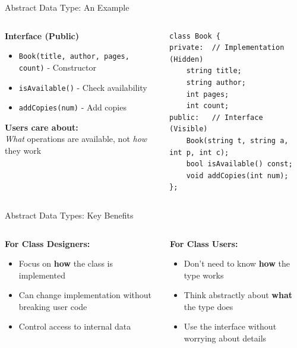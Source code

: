 \begin{frame}[fragile]{Abstract Data Type: An Example}
    \begin{columns}
        \begin{column}{0.5\textwidth}
        \textbf{Interface (Public)}
            \begin{itemize}
                \item \texttt{Book(title, author, pages, count)} - Constructor
                \item \texttt{isAvailable()} - Check availability
                \item \texttt{addCopies(num)} - Add copies
            \end{itemize}
            \vspace{0.3em}
            \textbf{Users care about:} \\
            \textit{What} operations are available, not \textit{how} they work
        \end{column}
        \begin{column}{0.5\textwidth}
            \begin{verbatim}
class Book {
private:  // Implementation (Hidden)
    string title;
    string author;
    int pages;
    int count;
public:   // Interface (Visible)
    Book(string t, string a, int p, int c);
    bool isAvailable() const;
    void addCopies(int num);
};
            \end{verbatim}
        \end{column}
    \end{columns}
\end{frame}

\begin{frame}[fragile]{Abstract Data Types: Key Benefits}

    \begin{columns}
        \begin{column}{0.5\textwidth}
            \textbf{For Class Designers:}
            \begin{itemize}
                \item Focus on \textbf{how} the class is implemented
                \item Can change implementation without breaking user code
                \item Control access to internal data
            \end{itemize}
        \end{column}
        \begin{column}{0.5\textwidth}
            \textbf{For Class Users:}
            \begin{itemize}
                \item Don't need to know \textbf{how} the type works
                \item Think abstractly about \textbf{what} the type does
                \item Use the interface without worrying about details
            \end{itemize}
        \end{column}
    \end{columns}
\end{frame}

